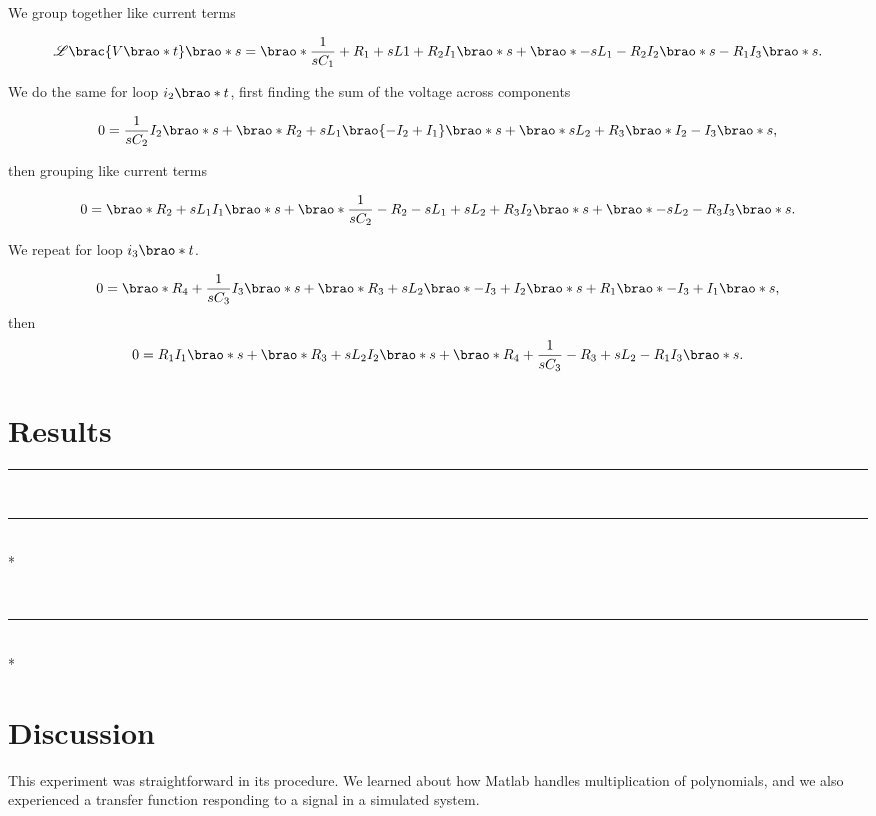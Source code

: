\documentclass[12pt]{article}
\DeclarePairedDelimiter\brao()%
\DeclarePairedDelimiter\brac[]%
\newlength\oldparskip
\newlength\newparskip
\newcommand*\setparskip{\setlength\parskip\newparskip}
\newcommand*\resetparskip{\setlength\parskip\oldparskip}
\def\hr{{\par\noindent\rule{\textwidth}{0.4pt}}}
\begin{document}
We group together like current terms

\begin{equation}
    \mathscr{L}\brac{V\brao*t}\brao*s = \brao*{\frac1{sC_1} + R_1 + sL1 + R_2} I_1\brao*s + \brao*{-sL_1 - R_2} I_2\brao*s - R_1 I_3\brao*s.
\end{equation}

We do the same for loop $i_2\brao*t$, first finding the sum of the voltage across components

\begin{equation}
    0 = \frac1{sC_2} I_2\brao*s +\brao*{R_2 + sL_1}\brao{-I_2 + I_1}\brao*s + \brao*{sL_2 + R_3}\brao*{I_2 - I_3}\brao*s,
\end{equation}

then grouping like current terms

\begin{equation}
    0 = \brao*{R_2 + sL_1}I_1\brao*s + \brao*{\frac1{sC_2} - R_2 - sL_1 + sL_2 + R_3} I_2\brao*s + \brao*{-sL_2 - R_3}I_3\brao*s.
\end{equation}

We repeat for loop $i_3\brao*t$.

\begin{equation}
    0 = \brao*{R_4 + \frac1{sC_3}} I_3\brao*s + \brao*{R_3 + sL_2}\brao*{-I_3 + I_2}\brao*s + R_1\brao*{-I_3 + I_1}\brao*s,
\end{equation}
then
\begin{equation}
    0 = R_1 I_1\brao*s + \brao*{R_3 + sL_2}I_2\brao*s + \brao*{R_4 + \frac1{sC_3} - R_3 + sL_2 - R_1}I_3\brao*s.
\end{equation}


\section{Results}

\hr
\resetparskip

\setparskip

\ \hr \\*
\resetparskip

\setparskip

\ \hr \\*

\section{Discussion}

This experiment was straightforward in its procedure.
We learned about how Matlab handles multiplication of polynomials,
and we also experienced a transfer function responding to a signal in a simulated system.
\end{document}
